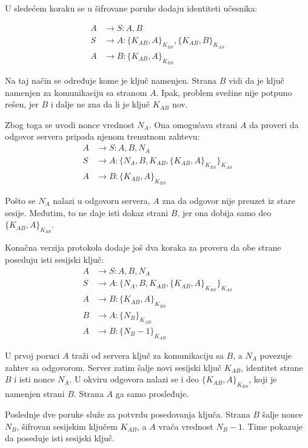 U sledećem koraku se u šifrovane poruke dodaju identiteti učesnika:

\[ \begin{aligned} A &\rightarrow S : A, B \\ S &\rightarrow A : \{K_{AB}, A\}_{K_{BS}}, \{K_{AB}, B\}_{K_{AS}} \\ A &\rightarrow B : \{K_{AB}, A\}_{K_{BS}} \end{aligned} \]

Na taj način se određuje kome je ključ namenjen. Strana \(B\) vidi da je ključ namenjen za komunikaciju sa stranom \(A\). Ipak, problem svežine nije potpuno rešen, jer \(B\) i dalje ne zna da li je ključ \(K_{AB}\) nov.

Zbog toga se uvodi nonce vrednost \(N_A\). Ona omogućava strani \(A\) da proveri da odgovor servera pripada njenom trenutnom zahtevu:
\[ \begin{aligned} A &\rightarrow S : A, B, N_A \\ S &\rightarrow A : \{N_A, B, K_{AB}, \{K_{AB}, A\}_{K_{BS}}\}_{K_{AS}} \\ A &\rightarrow B : \{K_{AB}, A\}_{K_{BS}} \end{aligned} \]

Pošto se \(N_A\) nalazi u odgovoru servera, \(A\) zna da odgovor nije preuzet iz stare sesije. Međutim, to ne daje isti dokaz strani \(B\), jer ona dobija samo deo \(\{K_{AB}, A\}_{K_{BS}}\).

Konačna verzija protokola dodaje još dva koraka za proveru da obe strane poseduju isti sesijski ključ:
\[ \begin{aligned} A &\rightarrow S : A, B, N_A \\ S &\rightarrow A : \{N_A, B, K_{AB}, \{K_{AB}, A\}_{K_{BS}}\}_{K_{AS}} \\ A &\rightarrow B : \{K_{AB}, A\}_{K_{BS}} \\ B &\rightarrow A : \{N_B\}_{K_{AB}} \\ A &\rightarrow B : \{N_B - 1\}_{K_{AB}} \end{aligned} \]

U prvoj poruci \(A\) traži od servera ključ za komunikaciju sa \(B\), a \(N_A\) povezuje zahtev sa odgovorom. Server zatim šalje novi sesijski ključ \(K_{AB}\), identitet strane \(B\) i isti nonce \(N_A\). U okviru odgovora nalazi se i deo \(\{K_{AB}, A\}_{K_{BS}}\), koji je namenjen strani \(B\). Strana \(A\) ga samo prosleđuje.

Poslednje dve poruke služe za potvrdu posedovanja ključa. Strana \(B\) šalje nonce \(N_B\), šifrovan sesijskim ključem \(K_{AB}\), a \(A\) vraća vrednost \(N_B - 1\). Time pokazuje da poseduje isti sesijski ključ.

